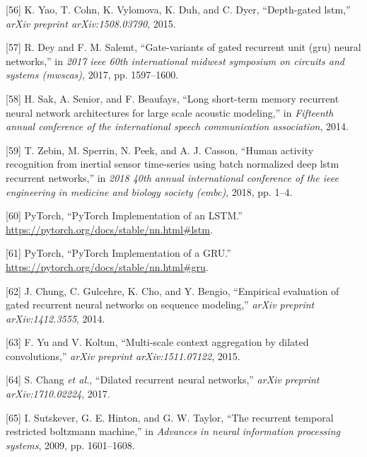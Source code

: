 \documentclass[12pt,]{article}
\begin{document}
\leavevmode\hypertarget{ref-yao2015depth}{}%
{[}56{]} K. Yao, T. Cohn, K. Vylomova, K. Duh, and C. Dyer,
``Depth-gated lstm,'' \emph{arXiv preprint arXiv:1508.03790}, 2015.

\leavevmode\hypertarget{ref-dey2017gate}{}%
{[}57{]} R. Dey and F. M. Salemt, ``Gate-variants of gated recurrent
unit (gru) neural networks,'' in \emph{2017 ieee 60th international
midwest symposium on circuits and systems (mwscas)}, 2017, pp.
1597--1600.

\leavevmode\hypertarget{ref-sak2014long}{}%
{[}58{]} H. Sak, A. Senior, and F. Beaufays, ``Long short-term memory
recurrent neural network architectures for large scale acoustic
modeling,'' in \emph{Fifteenth annual conference of the international
speech communication association}, 2014.

\leavevmode\hypertarget{ref-zebin2018human}{}%
{[}59{]} T. Zebin, M. Sperrin, N. Peek, and A. J. Casson, ``Human
activity recognition from inertial sensor time-series using batch
normalized deep lstm recurrent networks,'' in \emph{2018 40th annual
international conference of the ieee engineering in medicine and biology
society (embc)}, 2018, pp. 1--4.

\leavevmode\hypertarget{ref-pytorchlstm}{}%
{[}60{]} \relax PyTorch, ``PyTorch Implementation of an LSTM.'' \\
\url{https://pytorch.org/docs/stable/nn.html\#lstm}.

\leavevmode\hypertarget{ref-pytorchgru}{}%
{[}61{]} \relax PyTorch, ``PyTorch Implementation of a GRU.'' \\
\url{https://pytorch.org/docs/stable/nn.html\#gru}.

\leavevmode\hypertarget{ref-chung2014empirical}{}%
{[}62{]} J. Chung, C. Gulcehre, K. Cho, and Y. Bengio, ``Empirical
evaluation of gated recurrent neural networks on sequence modeling,''
\emph{arXiv preprint arXiv:1412.3555}, 2014.

\leavevmode\hypertarget{ref-yu2015multi}{}%
{[}63{]} F. Yu and V. Koltun, ``Multi-scale context aggregation by
dilated convolutions,'' \emph{arXiv preprint arXiv:1511.07122}, 2015.

\leavevmode\hypertarget{ref-chang2017dilated}{}%
{[}64{]} S. Chang \emph{et al.}, ``Dilated recurrent neural networks,''
\emph{arXiv preprint arXiv:1710.02224}, 2017.

\leavevmode\hypertarget{ref-sutskever2009recurrent}{}%
{[}65{]} I. Sutskever, G. E. Hinton, and G. W. Taylor, ``The recurrent
temporal restricted boltzmann machine,'' in \emph{Advances in neural
information processing systems}, 2009, pp. 1601--1608.
\end{document}
